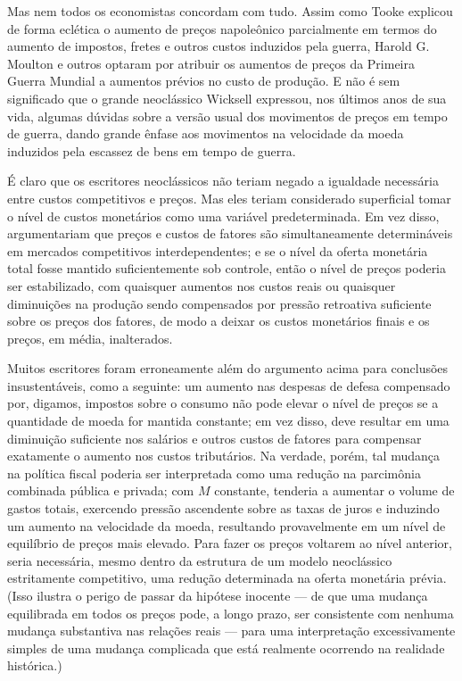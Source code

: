 \documentclass[12pt]{article}
\begin{document}
Mas nem todos os economistas concordam com tudo. Assim como Tooke explicou de forma eclética o aumento de preços napoleônico parcialmente em termos do aumento de impostos, fretes e outros custos induzidos pela guerra, Harold G. Moulton e outros optaram por atribuir os aumentos de preços da Primeira Guerra Mundial a aumentos prévios no custo de produção. E não é sem significado que o grande neoclássico Wicksell expressou, nos últimos anos de sua vida, algumas dúvidas sobre a versão usual dos movimentos de preços em tempo de guerra, dando grande ênfase aos movimentos na velocidade da moeda induzidos pela escassez de bens em tempo de guerra.

É claro que os escritores neoclássicos não teriam negado a igualdade necessária entre custos competitivos e preços. Mas eles teriam considerado superficial tomar o nível de custos monetários como uma variável predeterminada. Em vez disso, argumentariam que preços e custos de fatores são simultaneamente determináveis em mercados competitivos interdependentes; e se o nível da oferta monetária total fosse mantido suficientemente sob controle, então o nível de preços poderia ser estabilizado, com quaisquer aumentos nos custos reais ou quaisquer diminuições na produção sendo compensados por pressão retroativa suficiente sobre os preços dos fatores, de modo a deixar os custos monetários finais e os preços, em média, inalterados.

Muitos escritores foram erroneamente além do argumento acima para conclusões insustentáveis, como a seguinte: um aumento nas despesas de defesa compensado por, digamos, impostos sobre o consumo não pode elevar o nível de preços se a quantidade de moeda for mantida constante; em vez disso, deve resultar em uma diminuição suficiente nos salários e outros custos de fatores para compensar exatamente o aumento nos custos tributários. Na verdade, porém, tal mudança na política fiscal poderia ser interpretada como uma redução na parcimônia combinada pública e privada; com $M$ constante, tenderia a aumentar o volume de gastos totais, exercendo pressão ascendente sobre as taxas de juros e induzindo um aumento na velocidade da moeda, resultando provavelmente em um nível de equilíbrio de preços mais elevado. Para fazer os preços voltarem ao nível anterior, seria necessária, mesmo dentro da estrutura de um modelo neoclássico estritamente competitivo, uma redução determinada na oferta monetária prévia. (Isso ilustra o perigo de passar da hipótese inocente — de que uma mudança equilibrada em todos os preços pode, a longo prazo, ser consistente com nenhuma mudança substantiva nas relações reais — para uma interpretação excessivamente simples de uma mudança complicada que está realmente ocorrendo na realidade histórica.)
\end{document}
